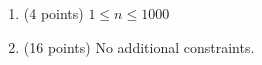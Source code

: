 \begin{enumerate}
    \tightlist
    \item (4 points) $1 \leq n \leq 1000$
    \item (16 points) No additional constraints.
\end{enumerate}
    